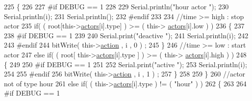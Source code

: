 \begin{DoxyCode}
225                     \{
226                     
227 \textcolor{preprocessor}{                    #if DEBUG == 1}
228                         
229                         Serial.println(\textcolor{stringliteral}{"hour actor "});
230                         Serial.println(i);
231                         Serial.println();
232 \textcolor{preprocessor}{                    #endif}
233 
234                         \textcolor{comment}{//time >= high : stop actor}
235                         \textcolor{keywordflow}{if}( ( root[this->\hyperlink{classJetpack_a7e16d2f97837f9712a2e6de1c50d99db}{actors}[i].type] ) >= ( this->
      \hyperlink{classJetpack_a7e16d2f97837f9712a2e6de1c50d99db}{actors}[i].low ) )     
236                         \{
237                         
238 \textcolor{preprocessor}{                        #if DEBUG == 1 }
239                             
240                             Serial.print(\textcolor{stringliteral}{"deactive "});
241                             Serial.println(i);
242                         
243 \textcolor{preprocessor}{                        #endif  }
244                             bitWrite( this->\hyperlink{classJetpack_aca3142925a7b0834b34ae91d26af7765}{action} , i , 0 ) ;    
245                         \}
246                         \textcolor{comment}{//time >= low : start actor}
247                         \textcolor{keywordflow}{else} \textcolor{keywordflow}{if}( ( root[ this->\hyperlink{classJetpack_a7e16d2f97837f9712a2e6de1c50d99db}{actors}[i].type ] ) >= ( this->
      \hyperlink{classJetpack_a7e16d2f97837f9712a2e6de1c50d99db}{actors}[i].high ) )
248                         \{
249                         
250 \textcolor{preprocessor}{                        #if DEBUG == 1 }
251                         
252                             Serial.print(\textcolor{stringliteral}{"active "});
253                             Serial.println(i);
254                         
255 \textcolor{preprocessor}{                        #endif}
256                             bitWrite( this->\hyperlink{classJetpack_aca3142925a7b0834b34ae91d26af7765}{action} , i , 1 ) ;                    
257                         \}
258                         
259                     \}
260                     \textcolor{comment}{//actor not of type hour}
261                     \textcolor{keywordflow}{else} \textcolor{keywordflow}{if}( ( this->\hyperlink{classJetpack_a7e16d2f97837f9712a2e6de1c50d99db}{actors}[i].type ) != ( \textcolor{stringliteral}{"hour"} ) )      
262                     \{
263                     
264 \textcolor{preprocessor}{                    #if DEBUG == 1 }

\end{DoxyCode}
